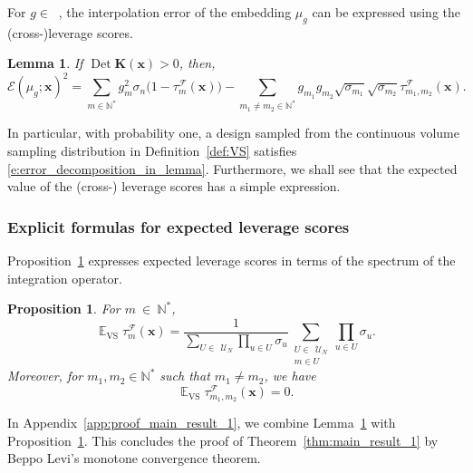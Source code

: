 \documentclass[twoside,11pt]{book}
\newtheorem{corollary}{Corollary}
\newtheorem{proposition}{Proposition}
\newtheorem{lemma}{Lemma}
\DeclareMathOperator{\Det}{Det}
\DeclareMathOperator{\VS}{\mathrm{VS}}
\DeclareMathOperator{\EX}{\mathbb{E}}
\DeclareMathOperator{\F}{\mathcal{F}}
\DeclareMathOperator{\Ltwo}{\mathbb{L}_{2}(\mathrm{d} \omega)}
\def\UN{\:\mathcal{U}_N}
\begin{document}
For $g \in \Ltwo$, the interpolation error of the embedding $\mu_{g}$ can be expressed using the (cross-)leverage scores.
\begin{lemma}\label{lemma:error_decomposition}
If $\Det \bm{K}(\bm{x}) > 0$, then,
\begin{equation}
\label{e:error_decomposition_in_lemma}
\mathcal{E}(\mu_{g};\bm{x})^{2}  = \sum\limits_{m \in \mathbb{N}^{*}}  g_{m}^{2} \sigma_{n}\bigg(1- \tau_{m}^{\F}(\bm{x})\bigg) - \sum\limits_{m_{1}\neq m_{2} \in \mathbb{N}^{*}}  g_{m_{1}}g_{m_{2}} \sqrt{\sigma_{m_{1}}} \sqrt{\sigma_{m_{2}}} \tau_{m_{1},m_{2}}^{\F}(\bm{x}).
\end{equation}
\end{lemma}
In particular, with probability one, a design sampled from the continuous volume sampling distribution in Definition~\ref{def:VS} satisfies \eqref{e:error_decomposition_in_lemma}. Furthermore, we shall see that the expected value of the (cross-) leverage scores has a simple expression.


\subsubsection{Explicit formulas for expected leverage scores}
\label{sec:closed_formulas}
Proposition~\ref{prop:EX_VS_lvs} expresses expected leverage scores in terms of the spectrum of the integration operator.
\begin{proposition}\label{prop:EX_VS_lvs}
For $m~\in~\mathbb{N}^{*}$,
\begin{equation}\label{eq:lvs_formula}
\EX_{\VS} \tau_{m}^{\F}(\bm{x})  = \frac{1}{\sum\limits_{U \in \: \UN} \prod\limits_{u \in U}\sigma_{u}}  \sum\limits_{\substack{U \in \: \UN \\ m \in U}} \prod\limits_{u \in U}\sigma_{u}.
\end{equation}
Moreover, for $m_{1},m_{2} \in \mathbb{N}^{*}$ such that $m_{1} \neq m_{2}$, we have
\begin{equation}\label{eq:cross_lvs_zero}
\EX_{\VS} \tau_{m_{1},m_{2}}^{\F}(\bm{x}) = 0.
\end{equation}
\end{proposition}

In Appendix~\ref{app:proof_main_result_1}, we combine Lemma~\ref{lemma:error_decomposition} with Proposition~\ref{prop:EX_VS_lvs}. This concludes the proof of Theorem~\ref{thm:main_result_1} by Beppo Levi's monotone convergence theorem.

\end{document}
